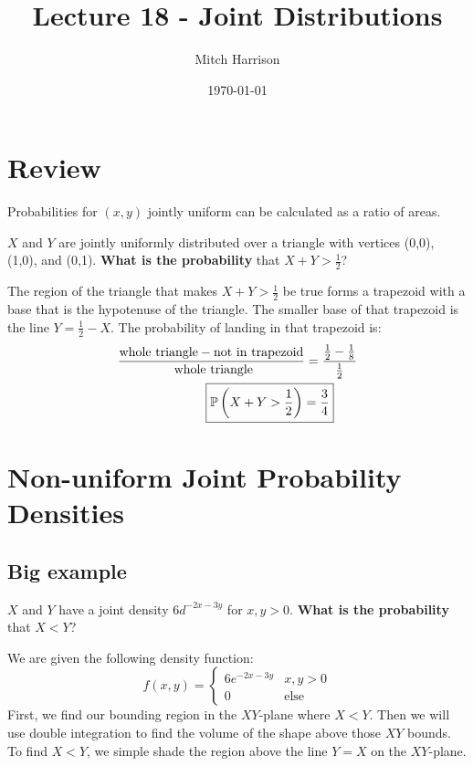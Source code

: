\documentclass[titlepage, 12pt, leqno]{article}
\title{\Huge{Lecture 18 - Joint Distributions}}
\author{\large{Mitch Harrison}}
\date{\today}
\begin{document}
\setlength{\parskip}{1\baselineskip}
\setlength{\parindent}{15pt}
\setlength{\columnsep}{0pt}
\maketitle
\tableofcontents
\newpage


\section{Review}

Probabilities for $(x,y)$ jointly uniform can be calculated as a ratio of areas.

\begin{ex}
    $X$ and $Y$ are jointly uniformly distributed over a triangle with vertices
    (0,0), (1,0), and (0,1). \textbf{What is the probability} that 
    $X+Y > \frac{1}{2}$?
    \vspace{10px}
    
    The region of the triangle that makes $X+Y>\frac{1}{2}$ be true forms a
    trapezoid with a base that is the hypotenuse of the triangle. The smaller base
    of that trapezoid is the line $Y = \frac{1}{2}-X$. The probability of landing 
    in that trapezoid is:
   \begin{align*}
       \frac{ \text{whole triangle} - \text{not in trapezoid}}{ \text{
       whole triangle}} &= \frac{\frac{1}{2}-\frac{1}{8}}{\frac{1}{2}} \\
       \Aboxed{\mathbb{P}\left(X+Y>\frac{1}{2}\right) &= \frac{3}{4}} 
   \end{align*}
\end{ex}

\pagebreak
\section{Non-uniform Joint Probability Densities}
\subsection{Big example}
$X$ and $Y$ have a joint density $6d^{-2x-3y}$ for $x,y>0$. \textbf{What is the
probability} that $X<Y$?
\vspace{10px}

 We are given the following density function:
 \[
 f(x,y) = 
 \begin{cases}
     6e^{-2x-3y} & x,y>0 \\
     0 & \text{else}
 \end{cases}
 \]
First, we find our bounding region in the $XY$-plane where $X<Y$. Then we will
use double integration to find the volume of the shape above those $XY$ bounds. 
To find $X<Y$, we simple shade the region above the line $Y=X$ on the $XY$-plane.
\end{document}

